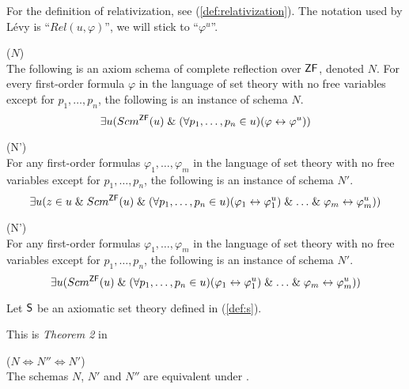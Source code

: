 For the definition of relativization, see (\ref{def:relativization}). The notation used by Lévy is ``$Rel(u, \varphi)$'', we will stick to ``$\varphi^{u}$''.
\begin{definition}{($N$)}\label{def:levy_axiom_n}\\
The following is an axiom schema of complete reflection over $\sf{ZF}$, denoted $N$. For every first-order formula $\varphi$ in the language of set theory with no free variables except for $p_1, \ldots , p_n$, the following is an instance of schema $N$.
\begin{equation}
\exists u (Scm^{\sf{ZF}}(u) \mathrel{\&} (\forall p_1, \ldots, p_n \in u)(\varphi \leftrightarrow \varphi^{u}))
\end{equation}
\end{definition}

\begin{definition}{(N')}\label{def:levy_axiom_n'}\\
For any first-order formulas $\varphi_1, \ldots, \varphi_m$ in the language of set theory with no free variables except for $p_1, \ldots , p_n$, the following is an instance of schema $N'$.
\begin{equation}
\exists u (z \in u \mathrel{\&} Scm^{\sf{ZF}}(u) \mathrel{\&} (\forall p_1, \ldots, p_n \in u)(\varphi_1 \leftrightarrow \varphi_1^{u}) \mathrel{\&} \ldots \mathrel{\&} \varphi_m \leftrightarrow \varphi_m^{u}))
\end{equation}
\end{definition}

\begin{definition}{(N')}\label{def:levy_axiom_n'}\\
For any first-order formulas $\varphi_1, \ldots, \varphi_m$ in the language of set theory with no free variables except for $p_1, \ldots , p_n$, the following is an instance of schema $N'$.
\begin{equation}
\exists u (Scm^{\sf{ZF}}(u) \mathrel{\&} (\forall p_1, \ldots, p_n \in u)(\varphi_1 \leftrightarrow \varphi_1^{u}) \mathrel{\&} \ldots \mathrel{\&} \varphi_m \leftrightarrow \varphi_m^{u}))
\end{equation}
\end{definition}

Let $\sf{S}$ be an axiomatic set theory defined in (\ref{def:s}). 

This is \emph{Theorem 2} in \cite{Levy1960a}
\begin{lemma}{($N \iff N'' \iff N'$)}\label{lemma:n_iff_n'}\\
The schemas $N$, $N'$ and $N''$ are equivalent under .
\end{lemma}


